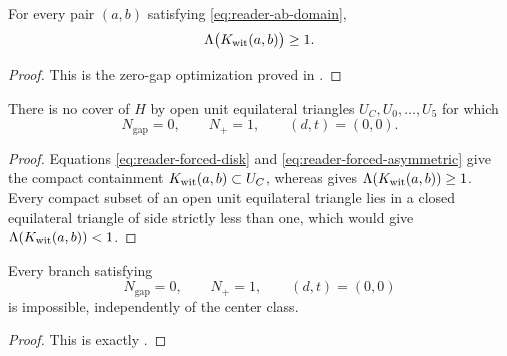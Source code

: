

\begin{theorem}
\label{thm:reader-witness-enclosure}
For every pair $(a,b)$ satisfying \eqref{eq:reader-ab-domain},
\[
 \Lambda\bigl(K_{\rm wit}(a,b)\bigr)\ge1.
\]
\end{theorem}

\begin{proof}
This is the zero-gap optimization proved in
.
\end{proof}

\begin{theorem}
\label{thm:reader-zero-gap-obstruction}
There is no cover of $H$ by open unit equilateral triangles
$U_C,U_0,\ldots,U_5$ for which
\[
 N_{\mathrm{gap}}=0,
 \qquad N_+=1,
 \qquad(d,t)=(0,0).
\]
\end{theorem}

\begin{proof}
Equations \eqref{eq:reader-forced-disk} and
\eqref{eq:reader-forced-asymmetric} give the compact containment
$K_{\rm wit}(a,b)\subset U_C$, whereas
 gives
$\Lambda(K_{\rm wit}(a,b))\ge1$.  Every compact subset of an open unit
equilateral triangle lies in a closed equilateral triangle of side strictly
less than one, which would give $\Lambda(K_{\rm wit}(a,b))<1$.
\end{proof}

\begin{proposition}
\label{prop:reader-ab-core-branches}
Every branch satisfying
\[
 N_{\mathrm{gap}}=0,
 \qquad N_+=1,
 \qquad(d,t)=(0,0)
\]
is impossible, independently of the center class.
\end{proposition}

\begin{proof}
This is exactly .
\end{proof}

